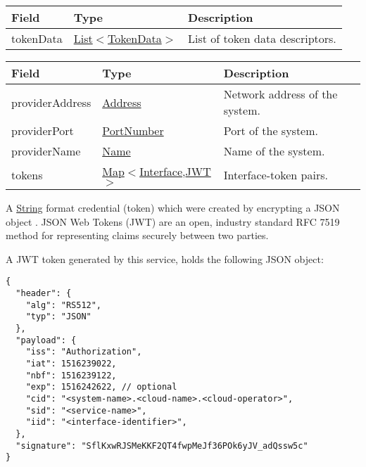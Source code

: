 \documentclass[a4paper]{arrowhead}
\newcommand{\fref}[1]{{\textcolor{ArrowheadBlue}{\hyperref[sec:functions:#1]{#1}}}}
\newcommand{\pref}[1]{{\textcolor{ArrowheadGrey}{\hyperref[sec:model:primitives:#1]{#1}}}}
\begin{document}
\label{sec:model:TokenGenerationResponse}
 
\begin{table}[ht!]
\begin{tabularx}{\textwidth}{| p{4.25cm} | p{3.5cm} | X |} \hline
\rowcolor{gray!33} Field & Type      & Description \\ \hline
tokenData & \pref{List}$<$\hyperref[sec:model:TokenData]{TokenData}$>$ & List of token data descriptors. \\ \hline
\end{tabularx}
\end{table}

\label{sec:model:TokenData}

\begin{table}[ht!]
\begin{tabularx}{\textwidth}{| p{4.25cm} | p{3.5cm} | X |} \hline
\rowcolor{gray!33} Field & Type      & Description \\ \hline
providerAddress & \pref{Address} & Network address of the system. \\ \hline
providerPort & \pref{PortNumber} & Port of the system. \\ \hline
providerName & \pref{Name} & Name of the system. \\ \hline
tokens &  \pref{Map}$<$\pref{Interface},\hyperref[sec:model:JWT]{JWT}$>$ & Interface-token pairs. \\ \hline 
\end{tabularx}
\end{table}

\label{sec:model:Token}

A \pref{String} format credential (token) which were created by encrypting a JSON object \cite{bray2014json}. JSON Web Tokens (JWT) are an open, industry standard RFC 7519 method for representing claims securely between two parties.

\clearpage

A JWT token generated by this service, holds the following JSON object:

\begin{lstlisting}[language=http,label={lst:authorization},caption={Content of a \fref{JWT token} generated by this service.}]
{
  "header": {
    "alg": "RS512",
    "typ": "JSON"
  },
  "payload": {
    "iss": "Authorization",
    "iat": 1516239022,
    "nbf": 1516239122,
    "exp": 1516242622, // optional
    "cid": "<system-name>.<cloud-name>.<cloud-operator>",
    "sid": "<service-name>",
    "iid": "<interface-identifier>",
  },
  "signature": "SflKxwRJSMeKKF2QT4fwpMeJf36POk6yJV_adQssw5c"
}
\end{lstlisting}
\end{document}
